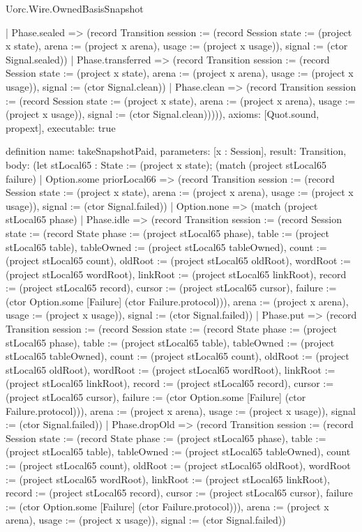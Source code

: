 \begin{lexlean}{Uorc.Wire.OwnedBasisSnapshot}
\begin{semanticmodule}
{      | Phase.sealed => (record Transition {session := (record Session {state := (project x state), arena := (project x arena), usage := (project x usage)}), signal := (ctor Signal.sealed)})
      | Phase.transferred => (record Transition {session := (record Session {state := (project x state), arena := (project x arena), usage := (project x usage)}), signal := (ctor Signal.clean)})
      | Phase.clean => (record Transition {session := (record Session {state := (project x state), arena := (project x arena), usage := (project x usage)}), signal := (ctor Signal.clean)})))),
  axioms: [Quot.sound, propext],
  executable: true
}

definition{
  name: takeSnapshotPaid,
  parameters: [x : Session],
  result: Transition,
  body: (let stLocal65 : State := (project x state); (match (project stLocal65 failure)
    | Option.some priorLocal66 => (record Transition {session := (record Session {state := (project x state), arena := (project x arena), usage := (project x usage)}), signal := (ctor Signal.failed)})
    | Option.none => (match (project stLocal65 phase)
      | Phase.idle => (record Transition {session := (record Session {state := (record State {phase := (project stLocal65 phase), table := (project stLocal65 table), tableOwned := (project stLocal65 tableOwned), count := (project stLocal65 count), oldRoot := (project stLocal65 oldRoot), wordRoot := (project stLocal65 wordRoot), linkRoot := (project stLocal65 linkRoot), record := (project stLocal65 record), cursor := (project stLocal65 cursor), failure := (ctor Option.some [Failure] (ctor Failure.protocol))}), arena := (project x arena), usage := (project x usage)}), signal := (ctor Signal.failed)})
      | Phase.put => (record Transition {session := (record Session {state := (record State {phase := (project stLocal65 phase), table := (project stLocal65 table), tableOwned := (project stLocal65 tableOwned), count := (project stLocal65 count), oldRoot := (project stLocal65 oldRoot), wordRoot := (project stLocal65 wordRoot), linkRoot := (project stLocal65 linkRoot), record := (project stLocal65 record), cursor := (project stLocal65 cursor), failure := (ctor Option.some [Failure] (ctor Failure.protocol))}), arena := (project x arena), usage := (project x usage)}), signal := (ctor Signal.failed)})
      | Phase.dropOld => (record Transition {session := (record Session {state := (record State {phase := (project stLocal65 phase), table := (project stLocal65 table), tableOwned := (project stLocal65 tableOwned), count := (project stLocal65 count), oldRoot := (project stLocal65 oldRoot), wordRoot := (project stLocal65 wordRoot), linkRoot := (project stLocal65 linkRoot), record := (project stLocal65 record), cursor := (project stLocal65 cursor), failure := (ctor Option.some [Failure] (ctor Failure.protocol))}), arena := (project x arena), usage := (project x usage)}), signal := (ctor Signal.failed)})
}
\end{semanticmodule}
\end{lexlean}
